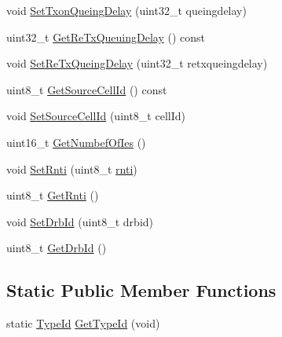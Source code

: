 \begin{DoxyCompactItemize}
\item 
void \hyperlink{classns3_1_1EpcX2AssistantInfoHeader_a121861529d6cfdf4c9823d28418fd5e5}{Set\+Txon\+Queing\+Delay} (uint32\+\_\+t queingdelay)
\item 
uint32\+\_\+t \hyperlink{classns3_1_1EpcX2AssistantInfoHeader_abde82b81cbc78c7503237a91ca3542f2}{Get\+Re\+Tx\+Queuing\+Delay} () const 
\item 
void \hyperlink{classns3_1_1EpcX2AssistantInfoHeader_afc9c738e90ee9d2e4c6614291e406371}{Set\+Re\+Tx\+Queing\+Delay} (uint32\+\_\+t retxqueingdelay)
\item 
uint8\+\_\+t \hyperlink{classns3_1_1EpcX2AssistantInfoHeader_a630ba6726feb573b14dba6ecc4e78418}{Get\+Source\+Cell\+Id} () const 
\item 
void \hyperlink{classns3_1_1EpcX2AssistantInfoHeader_a1f3000e2e8d64e53891d4c86daf8f24a}{Set\+Source\+Cell\+Id} (uint8\+\_\+t cell\+Id)
\item 
uint16\+\_\+t \hyperlink{classns3_1_1EpcX2AssistantInfoHeader_a2c10bc511b786dad4fce52dd29f97e9d}{Get\+Numbef\+Of\+Ies} ()
\item 
void \hyperlink{classns3_1_1EpcX2AssistantInfoHeader_a36e3cc48d0705d5f505c104f1e556d9b}{Set\+Rnti} (uint8\+\_\+t \hyperlink{classns3_1_1EpcX2AssistantInfoHeader_abdef6f91f7e05ecbf7278e3d550fa350}{rnti})
\item 
uint8\+\_\+t \hyperlink{classns3_1_1EpcX2AssistantInfoHeader_adda8daf64a4f5fcd07ae112b1c7cbd4b}{Get\+Rnti} ()
\item 
void \hyperlink{classns3_1_1EpcX2AssistantInfoHeader_a3c813f07cc872571ea58232554d649c0}{Set\+Drb\+Id} (uint8\+\_\+t drbid)
\item 
uint8\+\_\+t \hyperlink{classns3_1_1EpcX2AssistantInfoHeader_a24ef806b1712de78accaa45251c43e5a}{Get\+Drb\+Id} ()
\end{DoxyCompactItemize}
\subsection*{Static Public Member Functions}
\begin{DoxyCompactItemize}
\item 
static \hyperlink{classns3_1_1TypeId}{Type\+Id} \hyperlink{classns3_1_1EpcX2AssistantInfoHeader_a51e271fa90b030fa8ad4d6a9f6b9f9f4}{Get\+Type\+Id} (void)
\end{DoxyCompactItemize}

